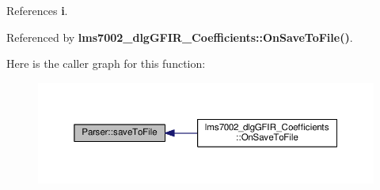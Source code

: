 References {\bf i}.



Referenced by {\bf lms7002\+\_\+dlg\+G\+F\+I\+R\+\_\+\+Coefficients\+::\+On\+Save\+To\+File()}.



Here is the caller graph for this function\+:
\nopagebreak
\begin{figure}[H]
\begin{center}
\leavevmode
\includegraphics[width=350pt]{d3/d71/namespaceParser_a8faf4a46d728b19f2224edfaed45c619_icgraph}
\end{center}
\end{figure}



